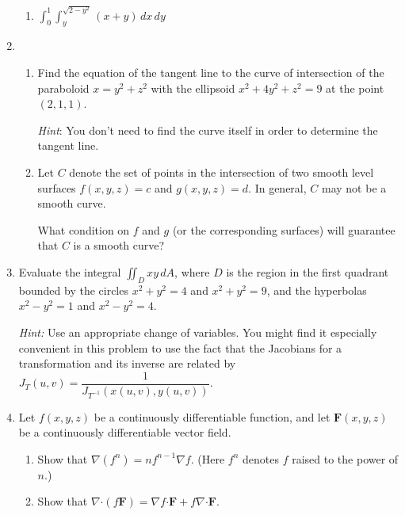 \documentclass[12pt]{article}
\newcommand{\points}[1]{\marginpar{\hspace{24pt}[#1]}}
\newcommand{\dotp}{\boldsymbol{\cdot}}
\newcommand{\di}{\displaystyle}
\newcommand{\F}{\mathbf{F}}
\begin{document}
\begin{enumerate}
\begin{enumerate}
\item $\di \int_0^1\int_y^{\sqrt{2-y^2}}(x+y)\,dx\,dy$ \points{6}
\end{enumerate}
\newpage

\item \begin{enumerate}
\item Find the equation of the tangent line to the curve of intersection of the paraboloid $x=y^2+z^2$ with the ellipsoid $x^2+4y^2+z^2=9$ at the point $(2,1,1)$.\points{6}

{\em Hint}: You don't need to find the curve itself in order to determine the tangent line.

\vspace{3.75in}

\item Let $C$ denote the set of points in the intersection of two smooth level surfaces $f(x,y,z)=c$ and $g(x,y,z)=d$. In general, $C$ may not be a smooth curve. \points{6}

What condition on $f$ and $g$ (or the corresponding surfaces) will guarantee that $C$ is a smooth curve?
\end{enumerate}
\newpage

\item Evaluate the integral $\di \iint_D xy\,dA$, where $D$ is the region in the first quadrant bounded by the circles $x^2+y^2=4$ and $x^2+y^2=9$, and the hyperbolas $x^2-y^2=1$ and $x^2-y^2=4$. \points{12}

{\em Hint:} Use an appropriate change of variables. You might find it especially convenient in this problem to use the fact that the Jacobians for a transformation and its inverse are related by $J_T(u,v) = \dfrac{1}{J_{T^{-1}}(x(u,v),y(u,v))}$.

\newpage

\item Let $f(x,y,z)$ be a continuously differentiable function, and let $\F(x,y,z)$ be a continuously differentiable vector field.
\begin{enumerate}
\item Show that $\nabla (f^n) = nf^{n-1}\nabla f$. (Here $f^n$ denotes $f$ raised to the power of $n$.)\points{5}

\vspace*{2.5in}

\item Show that $\nabla\dotp (f\F) = \nabla f\dotp \F+f\nabla\dotp \F$. \points{5}

\vspace*{2.5in}


\end{enumerate}
\end{enumerate}
\end{document}
